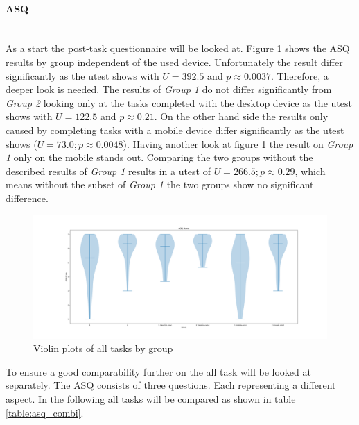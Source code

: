 \paragraph{ASQ}\mbox{}\\
As a start the \gls{post-task} questionnaire will be looked at. 
Figure \ref{fig:asq_group} shows the ASQ results by group independent of the used device.
Unfortunately the result differ significantly as the \gls{utest} shows with $U=392.5$ and $p \approx 0.0037$.
Therefore, a deeper look is needed. 
The results of \textit{Group 1} do not differ significantly from \textit{Group 2} looking only at the tasks completed with the desktop device as the \gls{utest} shows with $U=122.5$ and $p \approx 0.21$.
On the other hand side the results only caused by completing tasks with a mobile device differ significantly as the \gls{utest} shows ($U=73.0;p \approx 0.0048$).
Having another look at figure \ref{fig:asq_group} the result on \textit{Group 1} only on the mobile stands out. 
Comparing the two groups without the described results of \textit{Group 1} results in a \gls{utest} of $U=266.5; p \approx 0.29$, which means without the subset of \textit{Group 1} the two groups show no significant difference.

\begin{figure}
  \hspace*{-1.5in}
  \centering
  \includegraphics*[width=1.15\textwidth]{Evaluation/img/group_asq_violin.png}
  \caption{Violin plots of all tasks by group}
  \label{fig:asq_group}
\end{figure}

To ensure a good comparability further on the all task will be looked at separately. 
The \gls{ASQ} consists of three questions.
Each representing a different aspect.
In the following all tasks will be compared as shown in table \ref{table:asq_combi}.


